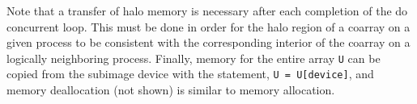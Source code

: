 Note that a transfer of halo memory is necessary after each completion of the do concurrent loop.
This must be done in order for the halo region of a coarray on a given process to be consistent
with the corresponding interior of the coarray on a logically neighboring process.
Finally, memory for the entire array \texttt{U} can be copied from the
subimage device with the statement,
\texttt{U = U[device]}, 
and memory deallocation (not shown) is similar to memory allocation.











